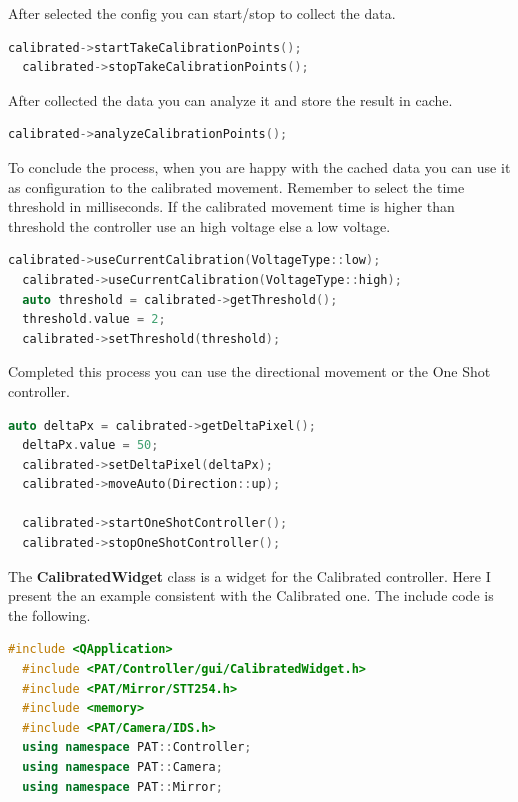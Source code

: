 After selected the config you can start/stop to collect the data.

\begin{lstlisting}[language=c++, gobble=2]
  calibrated->startTakeCalibrationPoints();
  calibrated->stopTakeCalibrationPoints();
\end{lstlisting}

After collected the data you can analyze it and store the result in
cache.

\begin{lstlisting}[language=c++, gobble=2]
  calibrated->analyzeCalibrationPoints();
\end{lstlisting}

To conclude the process, when you are happy with the cached data you can
use it as configuration to the calibrated movement. Remember to select
the time threshold in milliseconds. If the calibrated movement time is
higher than threshold the controller use an high voltage else a low
voltage.

\begin{lstlisting}[language=c++, gobble=2]
  calibrated->useCurrentCalibration(VoltageType::low);
  calibrated->useCurrentCalibration(VoltageType::high);
  auto threshold = calibrated->getThreshold();
  threshold.value = 2;
  calibrated->setThreshold(threshold);
\end{lstlisting}

Completed this process you can use the directional movement or the One
Shot controller.

\begin{lstlisting}[language=c++, gobble=2]
  auto deltaPx = calibrated->getDeltaPixel();
  deltaPx.value = 50;
  calibrated->setDeltaPixel(deltaPx);
  calibrated->moveAuto(Direction::up);
  
  calibrated->startOneShotController();
  calibrated->stopOneShotController();
\end{lstlisting}


The \textbf{CalibratedWidget} class is a widget for the Calibrated
controller. Here I present the an example consistent with the Calibrated
one. The include code is the following.

\begin{lstlisting}[language=c++, gobble=2]
  #include <QApplication>
  #include <PAT/Controller/gui/CalibratedWidget.h>
  #include <PAT/Mirror/STT254.h>
  #include <memory>
  #include <PAT/Camera/IDS.h>
  using namespace PAT::Controller;
  using namespace PAT::Camera;
  using namespace PAT::Mirror;
\end{lstlisting}

